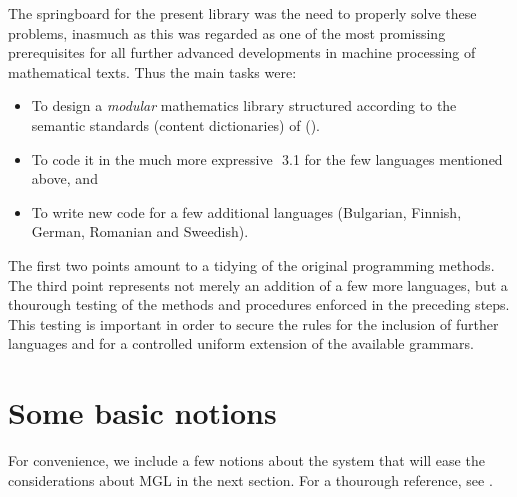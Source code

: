 \documentclass[submission,copyright,creativecommons]{eptcs}
\begin{document}
The springboard for the present library was the need to properly solve
these problems, inasmuch as this was regarded as one of the most promissing
prerequisites for all further advanced developments in machine processing
of mathematical texts.  Thus the main tasks were:
\begin{itemize}
\item
To design a \emph{modular} mathematics library structured according to
the semantic standards (content dictionaries) of \openmath{}
(\cite{OpenMath}).
\item
To code it in the much more expressive \GF{}\,\,3.1 for the few languages
mentioned above, and
\item
To write new code for a few additional languages (Bulgarian, Finnish,
German, Romanian and Sweedish).
\end{itemize}
The first two points amount to a tidying of the original \webalt{}
programming methods. The third point represents not merely an addition
of a few more languages, but a thourough testing of the methods and
procedures enforced in the preceding steps. This testing is important in
order to secure the rules for the inclusion of further languages and for
a controlled uniform extension of the available grammars.



\section{Some basic \GF{} notions}

For convenience, we include a few notions about the \GF{}
system that will ease the considerations about MGL in the next section.
For a thourough reference, see \cite{Ranta11}.
\end{document}

